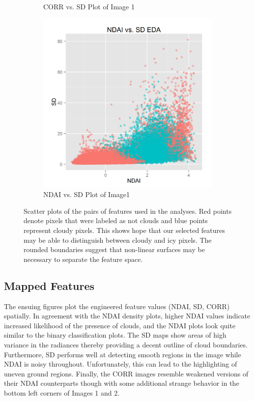 \documentclass{article}\usepackage[]{graphicx}\usepackage[]{color}
\begin{document}
\begin{figure}[]
\begin{subfigure}[b]{0.3\textwidth}
    \caption{CORR vs. SD Plot of Image 1}
    \label{CorrSd}
  \end{subfigure}  
  \begin{subfigure}[b]{0.3\textwidth}
    \includegraphics[width=\linewidth]{NDAI_vs_SD.png}
    \caption{NDAI vs. SD Plot of Image1}
    \label{NdaiSd}
  \end{subfigure}
  \caption{Scatter plots of the pairs of features used in the analyses. Red points denote pixels that were labeled as not clouds and blue points represent cloudy pixels. This shows hope that our selected features may be able to distinguish between cloudy and icy pixels.  The rounded boundaries suggest that non-linear surfaces may be necessary to separate the feature space.}
  \label{fig:Scatter}
\end{figure}

\subsection{Mapped Features}
The ensuing figures plot the engineered feature values (NDAI, SD, CORR) spatially. In agreement with the NDAI density plots, higher NDAI values indicate increased likelihood of the presence of clouds, and the NDAI plots look quite similar to the binary classification plots. The SD maps show areas of high variance in the radiances thereby providing a decent outline of cloud boundaries. Furthermore, SD performs well at detecting smooth regions in the image while NDAI is noisy throughout. Unfortunately, this can lead to the highlighting of uneven ground regions. Finally, the CORR images resemble weakened versions of their NDAI counterparts though with some additional strange behavior in the bottom left corners of Images 1 and 2. 
\end{document}
